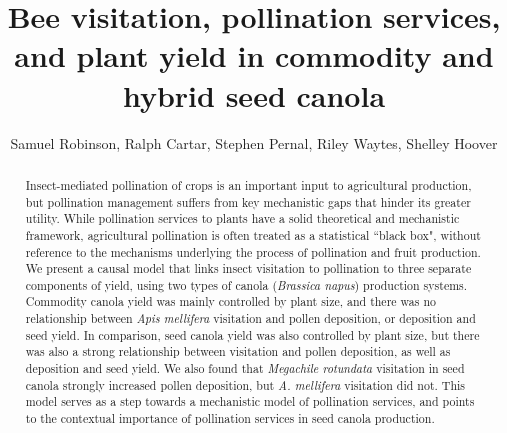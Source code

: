 \documentclass[12pt]{article} %
\title{Bee visitation, pollination services, and plant yield in commodity and hybrid seed canola}
\author{Samuel Robinson, Ralph Cartar, Stephen Pernal, Riley Waytes, Shelley Hoover}
\date{}
\begin{document}
\maketitle
\doublespacing

\begin{abstract}
Insect-mediated pollination of crops is an important input to agricultural production, but pollination management suffers from key mechanistic gaps that hinder its greater utility. 
While pollination services to plants have a solid theoretical and mechanistic framework, agricultural pollination is often treated as a statistical ``black box", without reference to the mechanisms underlying the process of pollination and fruit production.
We present a causal model that links insect visitation to pollination to three separate components of yield, using two types of canola (\textit{Brassica napus}) production systems.
Commodity canola yield was mainly controlled by plant size, and there was no relationship between \textit{Apis mellifera} visitation and pollen deposition, or deposition and seed yield.
In comparison, seed canola yield was also controlled by plant size, but there was also a strong relationship between visitation and pollen deposition, as well as deposition and seed yield.
We also found that \textit{Megachile rotundata} visitation in seed canola strongly increased pollen deposition, but \textit{A. mellifera} visitation did not.
This model serves as a step towards a mechanistic model of pollination services, and points to the contextual importance of pollination services in seed canola production.

\end{abstract}

    
\end{document}
